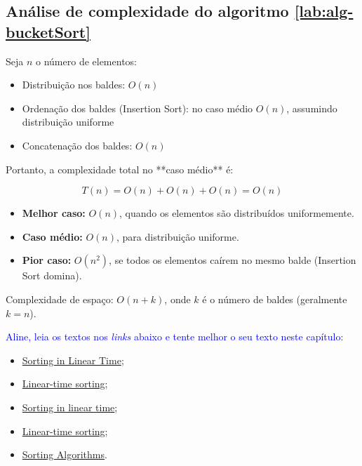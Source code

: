 \subsection{Análise de complexidade do algoritmo \ref{lab:alg-bucketSort}}

Seja $n$ o número de elementos:

\begin{itemize}
    \item Distribuição nos baldes: $O(n)$
    \item Ordenação dos baldes (Insertion Sort): no caso médio $O(n)$, assumindo distribuição uniforme
    \item Concatenação dos baldes: $O(n)$
\end{itemize}

Portanto, a complexidade total no **caso médio** é:

\[
T(n) = O(n) + O(n) + O(n) = O(n)
\]

\begin{itemize}
    \item \textbf{Melhor caso:} $O(n)$, quando os elementos são distribuídos uniformemente.
    \item \textbf{Caso médio:} $O(n)$, para distribuição uniforme.
    \item \textbf{Pior caso:} $O(n^2)$, se todos os elementos caírem no mesmo balde (Insertion Sort domina).
\end{itemize}

Complexidade de espaço: $O(n + k)$, onde $k$ é o número de baldes (geralmente $k=n$).
\vspace{1cm}

\textcolor{blue}{Aline, leia os textos nos \textit{links} abaixo e tente melhor o seu texto neste capítulo}: 
\begin{itemize}
    \item 
\href{https://www.ic.unicamp.br/~ra063658/disciplinas/stco02_2025s1/sort_linear.pdf}{Sorting in Linear Time};

\item \href{https://ocw.mit.edu/courses/6-006-introduction-to-algorithms-fall-2011/bf7d79105762bf79bbc0925438e1468a_MIT6_006F11_lec07.pdf}{Linear-time sorting};

\item  \href{https://iudatastructurescourse.github.io/course-web-page-fall-2024/lectures/sort-linear.html}{Sorting in linear time};

\item \href{http://personal.kent.edu/~amohamm4/daa-f2019/slides/ch4-2%20LinearTime%20Sorting.pdf}{Linear-time sorting};

\item
\href{https://www.dcc.fc.up.pt/~pribeiro/aulas/aed2425/slides/4_sorting.pdf}{Sorting Algorithms}.
\end{itemize}

